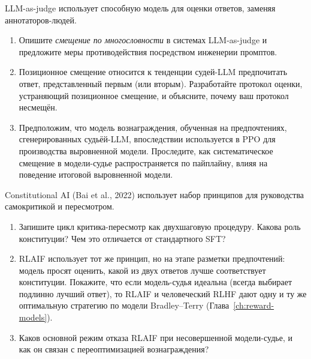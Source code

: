 \begin{exercise}
\label{ex:llm-as-judge}
LLM-as-judge использует способную модель для оценки ответов, заменяя аннотаторов-людей.
\begin{enumerate}
  \item Опишите \emph{смещение по многословности} в системах LLM-as-judge и предложите меры противодействия посредством инженерии промптов.
  \item Позиционное смещение относится к тенденции судей-LLM предпочитать ответ, представленный первым (или вторым). Разработайте протокол оценки, устраняющий позиционное смещение, и объясните, почему ваш протокол несмещён.
  \item Предположим, что модель вознаграждения, обученная на предпочтениях, сгенерированных судьёй-LLM, впоследствии используется в PPO для производства выровненной модели. Проследите, как систематическое смещение в модели-судье распространяется по пайплайну, влияя на поведение итоговой выровненной модели.
\end{enumerate}
\end{exercise}

\begin{exercise}
\label{ex:constitutional-ai}
Constitutional AI (Bai et al., 2022) использует набор принципов для руководства самокритикой и пересмотром.
\begin{enumerate}
  \item Запишите цикл критика-пересмотр как двухшаговую процедуру. Какова роль конституции? Чем это отличается от стандартного SFT?
  \item RLAIF использует тот же принцип, но на этапе разметки предпочтений: модель просят оценить, какой из двух ответов лучше соответствует конституции. Покажите, что если модель-судья идеальна (всегда выбирает подлинно лучший ответ), то RLAIF и человеческий RLHF дают одну и ту же оптимальную стратегию по модели Bradley--Terry (Глава~\ref{ch:reward-models}).
  \item Каков основной режим отказа RLAIF при несовершенной модели-судье, и как он связан с переоптимизацией вознаграждения?
\end{enumerate}
\end{exercise}

